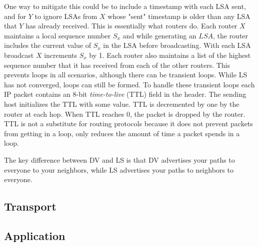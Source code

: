 One way to mitigate this could be to include a timestamp with each LSA
sent, and for $Y$ to ignore LSAs from $X$ whose "sent" timestamp is older than
any LSA that $Y$ has already received. This is essentially what routers do.
Each router $X$ maintains a local sequence number $S_x$ and while generating
an $LSA$, the router includes the current value of $S_x$ in the LSA before
broadcasting. With each LSA broadcast $X$ increments $S_x$ by 1. Each
router also maintains a list of the highest sequence number that it has
received from each of the other routers. This prevents loops in all scenarios,
although there can be transient loops. While LS has not converged, loops
can still be formed. To handle these transient loops each IP packet contains
an 8-bit \emph{time-to-live} (TTL) field in the header. The sending host
initializes the TTL with some value. TTL is decremented by one by the
router at each hop. When TTL reaches 0, the packet is dropped by the
router. TTL is not a substitute for routing protocols because it does not
prevent packets from getting in a loop, only reduces the amount of time
a packet spends in a loop.

The key difference between DV and LS is that DV advertises your paths to
everyone to your neighbors, while LS advertises your paths to neighbors
to everyone.

\subsection{Transport}

\subsection{Application}


